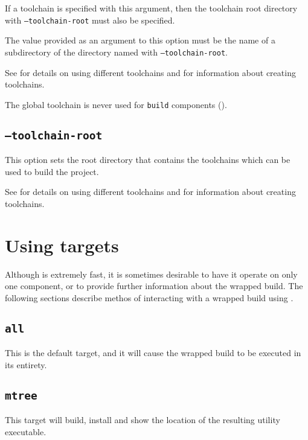 If a toolchain is specified with this argument, then the toolchain
root directory with \texttt{--toolchain-root} must also be specified.

The value provided as an argument to this option must be the name of a
subdirectory of the directory named with \texttt{--toolchain-root}.

See  for details on using different
toolchains and  for information
about creating toolchains.

The global toolchain is never used for \texttt{build} components
().

\subsection{\texttt{--toolchain-root}}\label{usinglmsbw:toolchain-root}

This option sets the root directory that contains the toolchains which
can be used to build the project.

See  for details on using different
toolchains and  for information
about creating toolchains.

\section{Using \lmsbw targets}\label{usinglmsbw:target:verbs}

Although \lmsbw is extremely fast, it is sometimes desirable to have
it operate on only one component, or to provide further information
about the wrapped build.  The following sections describe methos of
interacting with a wrapped build using \lmsbw.

\subsection{\texttt{all}}\label{usinglmsbw:target:all}

This is the default target, and it will cause the wrapped build to be
executed in its entirety.

\subsection{\texttt{mtree}}

This target will build, install and show the location of the resulting
\mtree utility executable.

